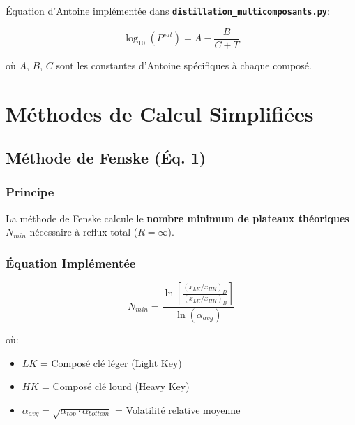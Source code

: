 \documentclass[11pt,a4paper]{article}
\newcommand{\file}[1]{\texttt{\textbf{#1}}}
\begin{document}
Équation d'Antoine implémentée dans \file{distillation\_multicomposants.py}:

\begin{equation}
\log_{10}(P^{sat}) = A - \frac{B}{C + T}
\end{equation}

où $A$, $B$, $C$ sont les constantes d'Antoine spécifiques à chaque composé.

\section{Méthodes de Calcul Simplifiées}

\subsection{Méthode de Fenske (Éq. 1)}

\subsubsection{Principe}

La méthode de Fenske calcule le \textbf{nombre minimum de plateaux théoriques} $N_{min}$ nécessaire à reflux total ($R = \infty$).

\subsubsection{Équation Implémentée}

\begin{tcolorbox}[colback=yellow!10,colframe=orange!50!black,title=Équation 1: Fenske]
\begin{equation}
N_{min} = \frac{\ln\left[\frac{(x_{LK}/x_{HK})_D}{(x_{LK}/x_{HK})_B}\right]}{\ln(\alpha_{avg})}
\end{equation}
\end{tcolorbox}

où:
\begin{itemize}[leftmargin=*]
    \item $LK$ = Composé clé léger (Light Key)
    \item $HK$ = Composé clé lourd (Heavy Key)
    \item $\alpha_{avg} = \sqrt{\alpha_{top} \cdot \alpha_{bottom}}$ = Volatilité relative moyenne
\end{itemize}
\end{document}
